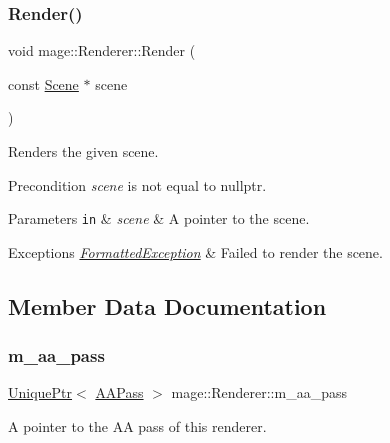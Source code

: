 \subsubsection{\texorpdfstring{Render()}{Render()}}
{\footnotesize\ttfamily void mage\+::\+Renderer\+::\+Render (\begin{DoxyParamCaption}\item[{const \hyperlink{classmage_1_1_scene}{Scene} $\ast$}]{scene }\end{DoxyParamCaption})}

Renders the given scene.

\begin{DoxyPrecond}{Precondition}
{\itshape scene} is not equal to {\ttfamily nullptr}. 
\end{DoxyPrecond}

\begin{DoxyParams}[1]{Parameters}
\mbox{\tt in}  & {\em scene} & A pointer to the scene. \\
\hline
\end{DoxyParams}

\begin{DoxyExceptions}{Exceptions}
{\em \hyperlink{classmage_1_1_formatted_exception}{Formatted\+Exception}} & Failed to render the scene. \\
\hline
\end{DoxyExceptions}


\subsection{Member Data Documentation}
\hypertarget{classmage_1_1_renderer_a275986047921b355d94b1a7111df6665}{}\label{classmage_1_1_renderer_a275986047921b355d94b1a7111df6665} 
\subsubsection{\texorpdfstring{m\+\_\+aa\+\_\+pass}{m\_aa\_pass}}
{\footnotesize\ttfamily \hyperlink{namespacemage_a3316d7143a973e37adf1110f2e80ca31}{Unique\+Ptr}$<$ \hyperlink{classmage_1_1_a_a_pass}{A\+A\+Pass} $>$ mage\+::\+Renderer\+::m\+\_\+aa\+\_\+pass\hspace{0.3cm}{\ttfamily [private]}}

A pointer to the AA pass of this renderer. \hypertarget{classmage_1_1_renderer_a21db5f4d584b3325911d132d0022b856}{}\label{classmage_1_1_renderer_a21db5f4d584b3325911d132d0022b856} 
